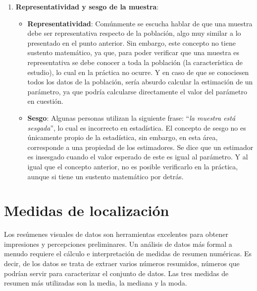 \documentclass[
  11pt,
]{book}
\theoremstyle{definition}
\theoremstyle{definition}
\theoremstyle{definition}
\theoremstyle{definition}
\theoremstyle{remark}
\begin{document}
\begin{enumerate}
\begin{figure}
  \caption{Muestra 2}\label{fig:figura-muestra2}
  \end{figure}

  Efectivamente, diferentes muestras se comportan de manera diferente, es decir, la estimación depende de la selección de la muestra. Esto se denomina como \textbf{variabilidad muestral}.
\item
  \textbf{Representatividad y sesgo de la muestra}:

  \begin{itemize}
  \item
    \textbf{Representatividad}: Comúnmente se escucha hablar de que una muestra debe ser representativa respecto de la población, algo muy similar a lo presentado en el punto anterior. Sin embargo, este concepto no tiene sustento matemático, ya que, para poder verificar que una muestra es representativa se debe conocer a toda la población (la característica de estudio), lo cual en la práctica no ocurre. Y en caso de que se conociesen todos los datos de la población, sería absurdo calcular la estimación de un parámetro, ya que podría calcularse directamente el valor del parámetro en cuestión.
  \item
    \textbf{Sesgo}: Algunas personas utilizan la siguiente frase: ``\emph{la muestra está sesgada}'', lo cual es incorrecto en estadística. El concepto de sesgo no es únicamente propio de la estadística, sin embargo, en esta área, corresponde a una propiedad de los estimadores. Se dice que un estimador es insesgado cuando el valor esperado de este es igual al parámetro. Y al igual que el concepto anterior, no es posible verificarlo en la práctica, aunque si tiene un sustento matemático por detrás.
  \end{itemize}
\end{enumerate}

\section{Medidas de localización}\label{topicos-medidas-localizacion}

Los resúmenes visuales de datos son herramientas excelentes para obtener impresiones y percepciones preliminares. Un análisis de datos más formal a menudo requiere el cálculo e interpretación de medidas de resumen numéricas. Es decir, de los datos se trata de extraer varios números resumidos, números que podrían servir para caracterizar el conjunto de datos. Las tres medidas de resumen más utilizadas son la media, la mediana y la moda.
\end{document}
